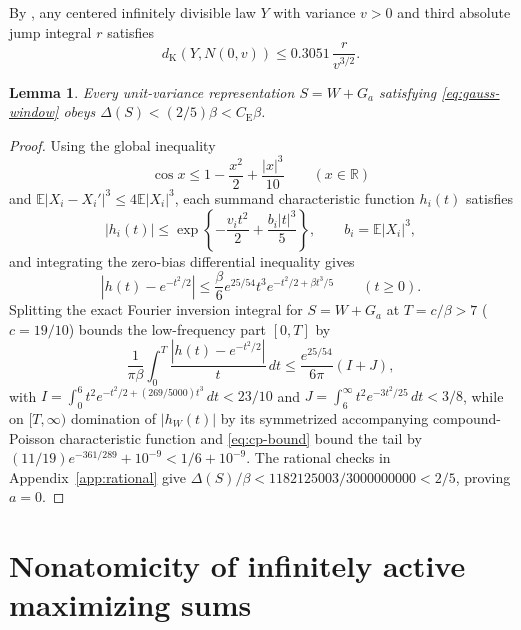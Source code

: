 \documentclass[11pt]{article}
\numberwithin{equation}{section}
\newtheorem{lemma}[theorem]{Lemma}
\theoremstyle{definition}
\newcommand{\E}{\mathbb E}
\newcommand{\R}{\mathbb R}
\newcommand{\ce}{C_{\mathrm E}}
\begin{document}
By \citet[Section~3.3, Theorem~2]{KorolevShevtsova2012}, any centered
infinitely divisible law $Y$ with variance $v>0$ and third absolute jump
integral $r$ satisfies
\begin{equation}\label{eq:cp-bound}
                       d_{\mathrm K}(Y,N(0,v))\le0.3051\,\frac{r}{v^{3/2}}.
\end{equation}

\begin{lemma}\label{lem:gauss-window-exclusion}
Every unit-variance representation $S=W+G_a$ satisfying \eqref{eq:gauss-window}
obeys $\Delta(S)<(2/5)\beta<\ce\beta$.
\end{lemma}
\begin{proof}
Using the global inequality
\begin{equation}\label{eq:cosine}
                   \cos x\le1-\frac{x^2}{2}+\frac{|x|^3}{10}\qquad(x\in\R)
\end{equation}
and $\E|X_i-X_i'|^3\le4\E|X_i|^3$, each summand characteristic function
$h_i(t)$ satisfies
\begin{equation}\label{eq:cf-modulus}
 |h_i(t)|\le\exp\left\{-\frac{v_it^2}{2}+\frac{b_i|t|^3}{5}\right\},
          \qquad b_i=\E|X_i|^3,
\end{equation}
and integrating the zero-bias differential inequality gives
\begin{equation}\label{eq:cf-difference}
 |h(t)-e^{-t^2/2}|
 \le\frac\beta6e^{25/54}t^3e^{-t^2/2+\beta t^3/5}\qquad(t\ge0).
\end{equation}
Splitting the exact Fourier inversion integral for $S=W+G_a$ at
$T=c/\beta>7$ ($c=19/10$) bounds the low-frequency part $[0,T]$ by
\begin{equation}\label{eq:low-integral}
 \frac1{\pi\beta}\int_0^T\frac{|h(t)-e^{-t^2/2}|}{t}\,dt
       \le\frac{e^{25/54}}{6\pi}(I+J),
\end{equation}
with $I=\int_0^6t^2e^{-t^2/2+(269/5000)t^3}\,dt<23/10$ and
$J=\int_6^\infty t^2e^{-3t^2/25}\,dt<3/8$, while on $[T,\infty)$ domination of
$|h_W(t)|$ by its symmetrized accompanying compound-Poisson characteristic
function and \eqref{eq:cp-bound} bound the tail by
$(11/19)e^{-361/289}+10^{-9}<1/6+10^{-9}$. The rational checks in
Appendix~\ref{app:rational} give $\Delta(S)/\beta<1182125003/3000000000<2/5$,
proving $a=0$.
\end{proof}

\section{Nonatomicity of infinitely active maximizing sums}\label{sec:nonatomic}
\end{document}
